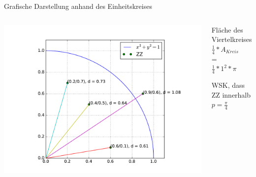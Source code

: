 \begin{frame}{Grafische Darstellung anhand des Einheitskreises}
  \begin{columns}[onlytextwidth]
    \begin{column}{0.7\textwidth}
	\centering
  	\includegraphics[scale=0.5]{BSP13_plot_monte_carlo_simulation.pdf}
  \end{column}

    \begin{column}{0.2\textwidth}
      \begin{block}{Fläche des Viertelkreises}
        $\frac{1}{4} * A_{Kreis}$\\
        = \\
        $\frac{1}{4}* 1^2 * \pi$      
      \end{block}
            \begin{block}{WSK, dass ZZ innerhalb}
	        $p = \frac{\pi}{4}$      
      \end{block}
      \end{column}
      \end{columns}
\end{frame} 

